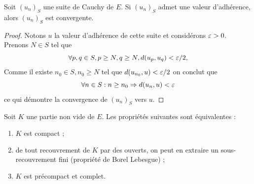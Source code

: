 \begin{lem}
\label{lem:adhCauchy}
Soit $(u_n)_S$ une suite de Cauchy de $E$. Si $(u_n)_S$ admet une valeur d'adhérence, alors $(u_n)_S$ est convergente.
\end{lem}

\begin{proof}
Notons $u$ la valeur d'adhérence de cette suite et considérons $\varepsilon >0$. Prenons $N \in S$ tel que 
\[ \forall p, q \in S, p \geq N, q \geq N, d(u_p, u_q) < \varepsilon/2 , \]
Comme il existe $n_0 \in S, n_0 \geq N$ tel que $d(u_{n_0}, u) < \varepsilon/2$ on conclut que 
\[ \forall n \in S : n \geq n_0 \Rightarrow d(u_n, u) < \varepsilon \]
ce qui démontre la convergence de $(u_n)_S$ vers $u$.
\end{proof}

\begin{thm}
Soit $K$ une partie non vide de $E$. Les propriétés suivantes sont équivalentes :
\begin{enumerate}[label=(\roman*)]
\item $K$ est compact ;
\item de tout recouvrement de $K$ par des ouverts, on peut en extraire un sous-recouvrement fini (propriété de Borel Lebesgue) ;
\item $K$ est précompact et complet.
\end{enumerate}
\end{thm}

